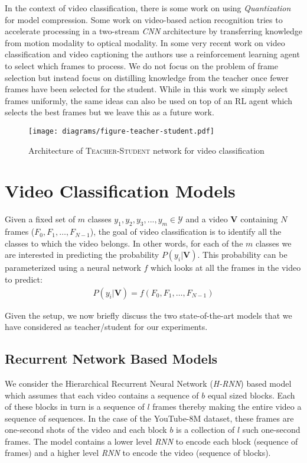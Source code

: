 \documentclass[10pt,twocolumn,letterpaper]{article}
\begin{document}
In the context of video classification, there is some work \cite{paper1,paper6} on using \textit{Quantization} for model compression. Some work on video-based action recognition \cite{motion-optical} tries to accelerate processing in a two-stream \textit{CNN} architecture by transferring knowledge from motion modality to optical modality. In some very recent work on video classification \cite{ijcai-rl} and video captioning \cite{less-frames-eccv} the authors use a reinforcement learning agent to select which frames to process. We do not focus on the problem of frame selection but instead focus on distilling knowledge from the teacher once fewer frames have been selected for the student. While in this work we simply select frames uniformly, the same ideas can also be used on top of an RL agent which selects the best frames but we leave this as a future work.



\begin{figure*}[t]
\centering
\texttt{[image: diagrams/figure-teacher-student.pdf]}
\caption{\label{diagram1} Architecture of \textsc{Teacher-Student} network for video classification}
\end{figure*}

\section{Video Classification Models}
Given a fixed set of $m$ classes $y_1, y_2, y_3, ..., y_m \in \mathscr{Y}$ and a video $\mathbf{V}$ containing $N$ frames ($F_{0}, F_{1},\dots,F_{N-1}$), the goal of video classification is to identify all the classes to which the video belongs. In other words, for each of the $m$ classes we are interested in predicting the probability $P(y_i | \mathbf{V})$. This probability can be parameterized using a neural network $f$ which looks at all the frames in the video to predict:
\begin{align*}
P(y_i | \mathbf{V}) = f(F_{0}, F_{1},\dots,F_{N-1})
\end{align*}

Given the setup, we now briefly discuss the two state-of-the-art models that we have considered as teacher/student for our experiments. 

\subsection{Recurrent Network Based Models}
We consider the Hierarchical Recurrent Neural Network (\textit{H-RNN}) based model which assumes that each video contains a sequence of $b$ equal sized blocks. Each of these blocks in turn is a sequence of $l$ frames thereby making the entire video a sequence of sequences. In the case of the YouTube-8M dataset, these frames are one-second shots of the video and each block $b$ is a collection of $l$ such one-second frames. The model contains a lower level \textit{RNN} to encode each block (sequence of frames) and a higher level \textit{RNN} to encode the video (sequence of blocks).
\end{document}
